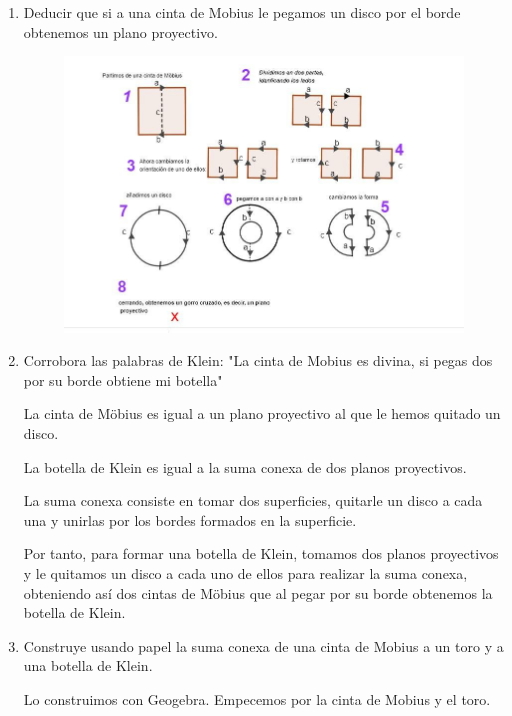 \begin{enumerate}
\item Deducir que si a una cinta de Mobius le pegamos un disco por el borde obtenemos un plano proyectivo.

\begin{figure}[H]
\centering
\includegraphics[scale=0.6]{images/universo/pagina_37_1.jpg}
\end{figure}

\item Corrobora las palabras de Klein: "La cinta de Mobius es divina, si pegas dos por su borde obtiene mi botella"

La cinta de Möbius es igual a un plano proyectivo al que le hemos quitado un disco.

La botella de Klein es igual a la suma conexa de dos planos proyectivos.

La suma conexa consiste en tomar dos superficies, quitarle un disco a cada una y unirlas por los bordes formados en la superficie.

Por tanto, para formar una botella de Klein, tomamos dos planos proyectivos y le quitamos un disco a cada uno de ellos para realizar la suma conexa, obteniendo así dos cintas de Möbius que al pegar por su borde obtenemos la botella de Klein.

\item Construye usando papel la suma conexa de una cinta de Mobius a un toro y a una botella de Klein.

Lo construimos con Geogebra. Empecemos por la cinta de Mobius y el toro.


\end{enumerate}
